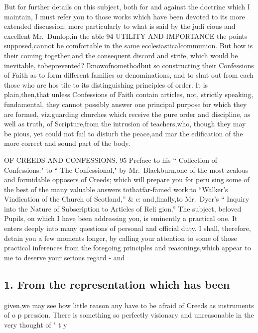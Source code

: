 \documentclass[
]{book}
\begin{document}
But for further details on this subject, both for and against the doctrine which I maintain, I must refer you to those works which have been devoted to its more extended discussion: more particularly to what is said by the judi cious and excellent Mr.~Dunlop,in the able
94 UTILITY AND IMPORTANCE
the points supposed,cannot be comfortable in the same ecclesiasticalcommunion. But how
is their coming together,and the consequent
discord and strife, which would be inevitable, tobeprevented? Iknowofnomethodbut so constructing their Confessions of Faith as to form different families or denominations, and to shut out from each those who are hos
tile to its distinguishing principles of order. It is plain,then,that unless Confessions of Faith contain articles, not, strictly speaking,
fundamental, they cannot possibly answer one principal purpose for which they are formed,
viz.guarding churches which receive the pure order and discipline, as well as truth, of Scripture,from the intrusion of teachers,who, though they may be pious, yet could not fail to disturb the peace,and mar the edification of the more correct and sound part of the body.

OF CREEDS AND CONFESSIONS. 95
Preface to his `` Collection of Confessions:" to
`` The Confessional," by Mr.~Blackburn,one of the most zealous and formidable opposers
of Creeds; which will prepare you for peru sing some of the best of the many valuable answers tothatfar-famed work:to ``Walker's Vindication of the Church of Scotland,'' \& c: and,finally,to Mr.~Dyer's `` Inquiry into the Nature of Subscription to Articles of Reli
gion.''
The subject, beloved Pupils, on which I have been addressing you, is eminently a practical one. It enters deeply into many questions of personal and official duty. I shall, therefore, detain you a few moments longer, by calling your attention to some of those practical inferences from the foregoing principles and reasonings,which appear to me to deserve your serious regard - and

\hypertarget{from-the-representation-which-has-been}{%
\subsection{1. From the representation which has been}\label{from-the-representation-which-has-been}}

given,we may see how little reason any have to be afraid of Creeds as instruments of o p
pression.
There is something so perfectly visionary and unreasonable in the very thought of " t y
\end{document}
